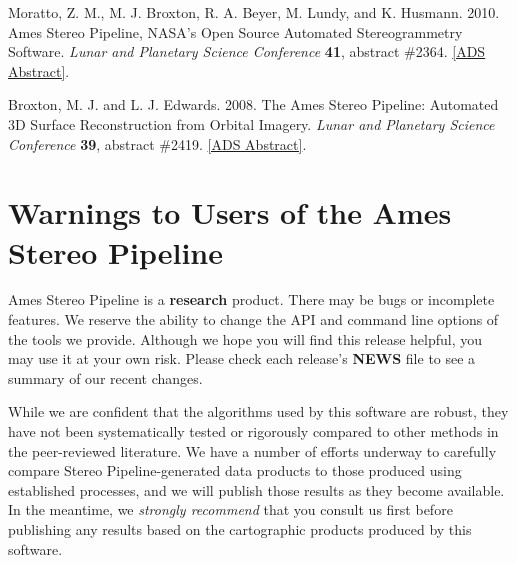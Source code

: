 \begin{description}
\item Moratto, Z. M., M. J. Broxton, R. A. Beyer, M. Lundy, and K. Husmann.
2010. Ames Stereo Pipeline, NASA's Open Source Automated Stereogrammetry
Software. \textit{Lunar and Planetary Science Conference} \textbf{41},
abstract \#2364.
\href{http://adsabs.harvard.edu/abs/2010LPI....41.2364M}{[ADS Abstract]}.

\item Broxton, M. J. and L. J. Edwards. 2008. The Ames Stereo Pipeline:
Automated 3D Surface Reconstruction from Orbital Imagery. \textit{Lunar
and Planetary Science Conference} \textbf{39}, abstract \#2419.
\href{http://adsabs.harvard.edu/abs/2008LPI....39.2419B}{[ADS Abstract]}.
\end{description}

\section{Warnings to Users of the Ames Stereo Pipeline}

Ames Stereo Pipeline is a {\bf research} product. There may be bugs or
incomplete features. We reserve the ability to change the API and
command line options of the tools we provide. Although we hope you will
find this release helpful, you may use it at your own risk. Please check
each release's {\bf NEWS} file to see a summary of our recent changes.

While we are confident that the algorithms used by this software are
robust, they have not been systematically tested or rigorously
compared to other methods in the peer-reviewed literature. We have a
number of efforts underway to carefully compare Stereo
Pipeline-generated data products to those produced using established
processes, and we will publish those results as they become available.
In the meantime, we {\it strongly recommend} that you consult us first
before publishing any results based on the cartographic products
produced by this software.
